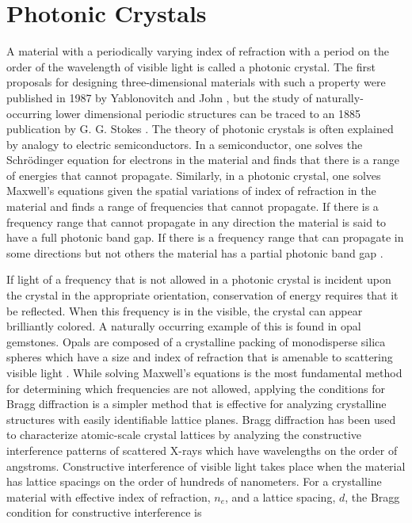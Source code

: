 \section{Photonic Crystals}
A material with a periodically varying index of refraction with a period on the order of the wavelength of visible light is called a photonic crystal.
The first proposals for designing three-dimensional materials with such a property were published in 1987 by Yablonovitch \cite{Yablonovitch:1987p1809} and John \cite{John:1987}, but the study of naturally-occurring lower dimensional periodic structures can be traced to an 1885 publication by G. G. Stokes \cite{Stokes:1885}.
The theory of photonic crystals is often explained by analogy to electric semiconductors.
In a semiconductor, one solves the Schr\"{o}dinger equation for electrons in the material and finds that there is a range of energies that cannot propagate.
Similarly, in a photonic crystal, one solves Maxwell's equations given the spatial variations of index of refraction in the material and finds a range of frequencies that cannot propagate.
If there is a frequency range that cannot propagate in any direction the material is said to have a full photonic band gap.
If there is a frequency range that can propagate in some directions but not others the material has a partial photonic band gap \cite{Joannopoulos:2008p11516}.

If light of a frequency that is not allowed in a photonic crystal is incident upon the crystal in the appropriate orientation, conservation of energy requires that it be reflected.
When this frequency is in the visible, the crystal can appear brilliantly colored.
A naturally occurring example of this is found in opal gemstones.
Opals are composed of a crystalline packing of monodisperse silica spheres which have a size and index of refraction that is amenable to scattering visible light \cite{Sanders1968}.
While solving Maxwell's equations is the most fundamental method for determining which frequencies are not allowed, applying the conditions for Bragg diffraction is a simpler method that is effective for analyzing crystalline structures with easily identifiable lattice planes.
Bragg diffraction has been used to characterize atomic-scale crystal lattices by analyzing the constructive interference patterns of scattered X-rays which have wavelengths on the order of angstroms.
Constructive interference of visible light takes place when the material has lattice spacings on the order of hundreds of nanometers.
For a crystalline material with effective index of refraction, $n_e$, and a lattice spacing, $d$, the Bragg condition for constructive interference is 

